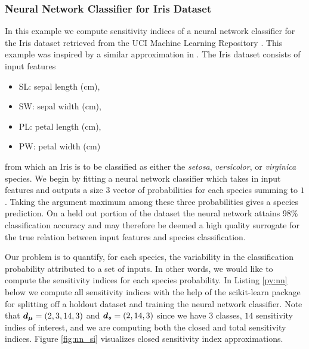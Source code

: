 \documentclass{article}[12pt]
\begin{document}
\subsubsection{Neural Network Classifier for Iris Dataset}

In this example we compute sensitivity indices of a neural network classifier for the Iris dataset retrieved from the UCI Machine Learning Repository \cite{uci_ml_repo}. This example was inspired by a similar approximation in \cite{hoyt2021efficient}. The Iris dataset consists of input features
\begin{itemize}
    \item SL: sepal length (cm),
    \item SW: sepal width (cm),
    \item PL: petal length (cm),
    \item PW: petal width (cm)
\end{itemize}
from which an Iris is to be classified as either the \emph{setosa}, \emph{versicolor}, or \emph{virginica} species. We begin by fitting a neural network classifier \cite{he2015delving} which takes in input features and outputs a size $3$ vector of probabilities for each species summing to $1$. Taking the argument maximum among these three probabilities gives a species prediction. On a held out portion of the dataset the neural network attains 98\% classification accuracy and may therefore be deemed a high quality surrogate for the true relation between input features and species classification. 

Our problem is to quantify, for each species, the variability in the classification probability attributed to a set of inputs. In other words, we would like to compute the sensitivity indices for each species probability. In Listing \ref{py:nn} below we compute all sensitivity indices with the help of the scikit-learn package \cite{scikit-learn} for splitting off a holdout dataset and training the neural network classifier. Note that $\boldsymbol{d}_{\boldsymbol{\mu}} = (2,3,14,3)$ and $\boldsymbol{d}_{\boldsymbol{s}} = (2,14,3)$ since we have $3$ classes, $14$ sensitivity indies of interest, and we are computing both the closed and total sensitivity indices. Figure \ref{fig:nn_si} visualizes closed sensitivity index approximations. 


\end{document}
